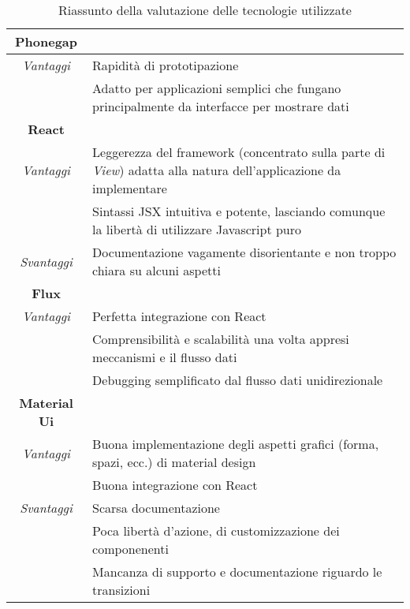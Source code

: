 \begin{table} [H] \centering
\begin{tabularx}{\textwidth}{|c|X|}
\hline
\textbf{Phonegap} & \\ \hline
\textit{Vantaggi}
& Rapidità di prototipazione \\ \hline
& Adatto per applicazioni semplici che fungano principalmente da interfacce per mostrare dati \\ \hline \hline
\textbf{React} & \\ \hline
\textit{Vantaggi}
& Leggerezza del framework (concentrato sulla parte di \textit{View}) adatta alla natura dell'applicazione da implementare \\ \hline
& Sintassi JSX intuitiva e potente, lasciando comunque la libertà di utilizzare Javascript puro \\ \hline
\textit{Svantaggi}
& Documentazione vagamente disorientante e non troppo chiara su alcuni aspetti \\ \hline \hline
\textbf{Flux} & \\ \hline
\textit{Vantaggi}
& Perfetta integrazione con React \\ \hline
& Comprensibilità e scalabilità una volta appresi meccanismi e il flusso dati \\ \hline
& Debugging semplificato dal flusso dati unidirezionale \\ \hline \hline
\textbf{Material Ui} & \\ \hline
\textit{Vantaggi}
& Buona implementazione degli aspetti grafici (forma, spazi, ecc.) di material design \\ \hline
& Buona integrazione con React \\ \hline
\textit{Svantaggi}
& Scarsa documentazione \\ \hline
& Poca libertà d'azione, di customizzazione dei componenenti \\ \hline
& Mancanza di supporto e documentazione riguardo le transizioni \\ \hline
\end{tabularx}
\caption{Riassunto della valutazione delle tecnologie utilizzate}
\end{table}
